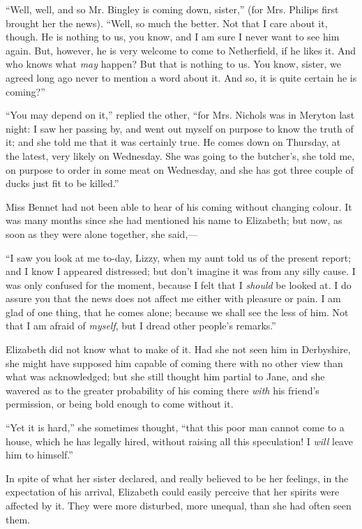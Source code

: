 \documentclass[12pt,openright]{book}
\begin{document}
“Well, well, and so Mr. Bingley is coming down, sister,” (for Mrs. Philips first brought her the news). “Well, so much the better. Not that I care about it, though. He is nothing to us, you know, and I am sure I never want to see him again. But, however, he is very welcome to come to Netherfield, if he likes it. And who knows what \textit{may} happen? But that is nothing to us. You know, sister, we agreed long ago never to mention a word about it. And so, it is quite certain he is coming?”

“You may depend on it,” replied the other, “for Mrs. Nichols was in Meryton last night: I saw her passing by, and went out myself on purpose to know the truth of it; and she told me that it was certainly true. He comes down on Thursday, at the latest, very likely on Wednesday. She was going to the butcher’s, she told me, on purpose to order in some meat on Wednesday, and she has got three couple of ducks just fit to be killed.”

Miss Bennet had not been able to hear of his coming without changing colour. It was many months since she had mentioned his name to Elizabeth; but now, as soon as they were alone together, she said,—

“I saw you look at me to-day, Lizzy, when my aunt told us of the present report; and I know I appeared distressed; but don’t imagine it was from any silly cause. I was only confused for the moment, because I felt that I \textit{should} be looked at. I do assure you that the news does not affect me either with pleasure or pain. I am glad of one thing, that he comes alone; because we shall see the less of him. Not that I am afraid of \textit{myself}, but I dread other people’s remarks.”

Elizabeth did not know what to make of it. Had she not seen him in Derbyshire, she might have supposed him capable of coming there with no other view than what was acknowledged; but she still thought him partial to Jane, and she wavered as to the greater probability of his coming there \textit{with} his friend’s permission, or being bold enough to come without it.

“Yet it is hard,” she sometimes thought, “that this poor man cannot come to a house, which he has legally hired, without raising all this speculation! I \textit{will} leave him to himself.”

In spite of what her sister declared, and really believed to be her feelings, in the expectation of his arrival, Elizabeth could easily perceive that her spirits were affected by it. They were more disturbed, more unequal, than she had often seen them.
\end{document}
